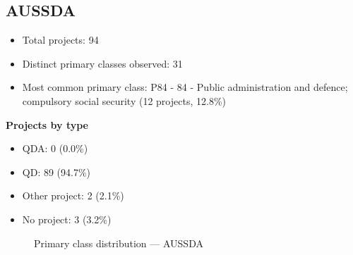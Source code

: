 \subsection{AUSSDA}

\begin{itemize}
    \item Total projects: 94
    \item Distinct primary classes observed: 31
    \item Most common primary class: P84 - 84 - Public administration and defence; compulsory social security (12 projects, 12.8\%)
\end{itemize}
\textbf{Projects by type}
\begin{itemize}
    \item QDA: 0 (0.0\%)
    \item QD: 89 (94.7\%)
    \item Other project: 2 (2.1\%)
    \item No project: 3 (3.2\%)
\end{itemize}

\begin{figure}[H]
    \centering
    
    \caption{Primary class distribution --- AUSSDA}
\end{figure}

